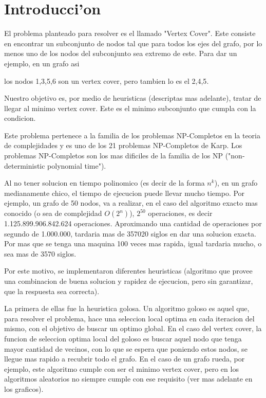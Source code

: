 \section{Introducci'on}
El problema planteado para resolver es el llamado "Vertex Cover". Este consiste en encontrar un subconjunto de nodos tal que para todos los ejes del grafo,
por lo menos uno de los nodos del subconjunto sea extremo de este.
Para dar un ejemplo, en un grafo asi


los nodos {1,3,5,6} son un vertex cover, pero tambien lo es el {2,4,5}.

Nuestro objetivo es, por medio de heuristicas (descriptas mas adelante), tratar de llegar al minimo vertex cover. Este es el minimo subconjunto que cumpla
con la condicion.

Este problema pertenece a la familia de los problemas NP-Completos en la teoria de complejidades y es uno de los 21 problemas NP-Completos de Karp. Los
problemas NP-Completos son los mas dificiles de la familia de los NP ("non-deterministic polynomial time").

Al no tener solucion en tiempo polinomico (es decir de la forma $n^k$), en un grafo medianamente chico, el tiempo de ejecucion puede llevar mucho tiempo.
Por ejemplo, un grafo de 50 nodos, va a realizar, en el caso del algoritmo exacto mas conocido (o sea de complejidad $O(2^n)$), $2^{50}$ operaciones, es decir
1.125.899.906.842.624 operaciones. Aproximando una cantidad de operaciones por segundo de 1.000.000, tardaria mas de 357020 siglos en dar una solucion exacta.
Por mas que se tenga una maquina 100 veces mas rapida, igual tardaria mucho, o sea mas de 3570 siglos.	

Por este motivo, se implementaron diferentes heuristicas (algoritmo que provee una combinacion de buena solucion y rapidez de ejecucion, pero sin garantizar,
que la respuesta sea correcta).

La primera de ellas fue la heuristica golosa. Un algoritmo goloso es aquel que, para resolver el problema, hace una seleccion local optima en cada iteracion
del mismo, con el objetivo de buscar un optimo global.
En el caso del vertex cover, la funcion de seleccion optima local del goloso es buscar aquel nodo que tenga mayor cantidad de vecinos, con lo que se espera
que poniendo estos nodos, se llegue mas rapido a recubrir todo el grafo.
En el caso de un grafo rueda, por ejemplo, este algoritmo cumple con ser el minimo vertex cover, pero en los algoritmos aleatorios no siempre cumple con
ese requisito (ver mas adelante en los graficos).


